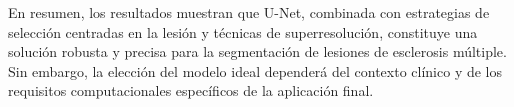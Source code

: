 \documentclass[../main.tex]{subfiles}
\begin{document}
En resumen, los resultados muestran que U-Net, combinada con estrategias de selección centradas en la lesión y técnicas de superresolución, constituye una solución robusta y precisa para la segmentación de lesiones de esclerosis múltiple. Sin embargo, la elección del modelo ideal dependerá del contexto clínico y de los requisitos computacionales específicos de la aplicación final.
\end{document}
